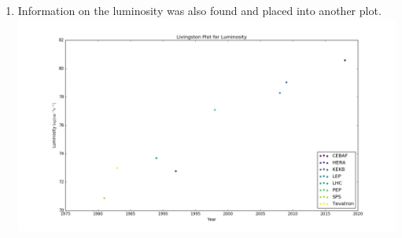 \documentclass[pdftex]{article}
\begin{document}
\begin{enumerate}
	\item Information on the luminosity was also found and placed into another plot.
	\includegraphics[scale=0.35]{acc_LogLum.png}\\




\end{enumerate}
\end{document}
